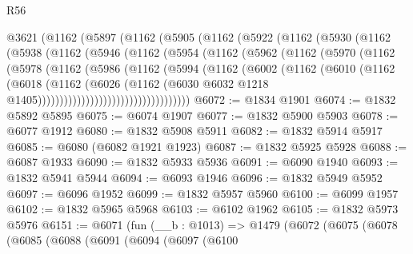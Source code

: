 \begin{lexlean}{R56}
\begin{coremodule}
    @3621
      (@1162
        (@5897
          (@1162
            (@5905
              (@1162
                (@5922
                  (@1162
                    (@5930
                      (@1162
                        (@5938
                          (@1162
                            (@5946
                              (@1162
                                (@5954
                                  (@1162
                                    (@5962
                                      (@1162
                                        (@5970
                                          (@1162
                                            (@5978
                                              (@1162
                                                (@5986
                                                  (@1162
                                                    (@5994
                                                      (@1162
                                                        (@6002
                                                          (@1162
                                                            (@6010
                                                              (@1162
                                                                (@6018
                                                                  (@1162
                                                                    (@6026
                                                                      (@1162
                                                                        (@6030
                                                                          @6032
                                                                          @1218
                                                                          @1405)))))))))))))))))))))))))))))))))))
@6072 := @1834 @1901
@6074 := @1832 @5892 @5895
@6075 := @6074 @1907
@6077 := @1832 @5900 @5903
@6078 := @6077 @1912
@6080 := @1832 @5908 @5911
@6082 := @1832 @5914 @5917
@6085 := @6080 (@6082 @1921 @1923)
@6087 := @1832 @5925 @5928
@6088 := @6087 @1933
@6090 := @1832 @5933 @5936
@6091 := @6090 @1940
@6093 := @1832 @5941 @5944
@6094 := @6093 @1946
@6096 := @1832 @5949 @5952
@6097 := @6096 @1952
@6099 := @1832 @5957 @5960
@6100 := @6099 @1957
@6102 := @1832 @5965 @5968
@6103 := @6102 @1962
@6105 := @1832 @5973 @5976
@6151 := @6071
    (fun (__b : @1013) =>
    @1479
      (@6072
        (@6075
          (@6078
            (@6085
              (@6088
                (@6091
                  (@6094
                    (@6097
                      (@6100

\end{coremodule}
\end{lexlean}
